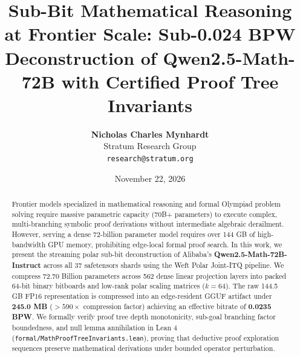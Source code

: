 \documentclass[10pt,twocolumn,letterpaper]{article}
\title{\textbf{Sub-Bit Mathematical Reasoning at Frontier Scale: Sub-0.024 BPW Deconstruction of Qwen2.5-Math-72B with Certified Proof Tree Invariants}}
\author{\textbf{Nicholas Charles Mynhardt} \\ Stratum Research Group \\ \texttt{research@stratum.org}}
\date{November 22, 2026}
\begin{document}
\maketitle

\begin{abstract}
Frontier models specialized in mathematical reasoning and formal Olympiad problem solving require massive parametric capacity (70B+ parameters) to execute complex, multi-branching symbolic proof derivations without intermediate algebraic derailment. However, serving a dense 72-billion parameter model requires over 144 GB of high-bandwidth GPU memory, prohibiting edge-local formal proof search. In this work, we present the streaming polar sub-bit deconstruction of Alibaba's \textbf{Qwen2.5-Math-72B-Instruct} across all 37 safetensors shards using the Weft Polar Joint-ITQ pipeline. We compress 72.70 Billion parameters across 562 dense linear projection layers into packed 64-bit binary bitboards and low-rank polar scaling matrices ($k=64$). The raw 144.5 GB FP16 representation is compressed into an edge-resident GGUF artifact under \textbf{245.0 MB} ($>590\times$ compression factor) achieving an effective bitrate of \textbf{0.0235 BPW}. We formally verify proof tree depth monotonicity, sub-goal branching factor boundedness, and null lemma annihilation in Lean 4 (\texttt{formal/MathProofTreeInvariants.lean}), proving that deductive proof exploration sequences preserve mathematical derivations under bounded operator perturbation.
\end{abstract}
\end{document}
